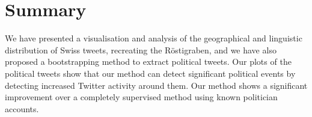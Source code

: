 \section{Summary}
We have presented a visualisation and analysis of the geographical and linguistic distribution of Swiss tweets, recreating the Röstigraben, and we have also proposed a bootstrapping method to extract political tweets. Our plots of the political tweets show that our method can detect significant political events by detecting increased Twitter activity around them. Our method shows a significant improvement over a completely supervised method using known politician accounts.